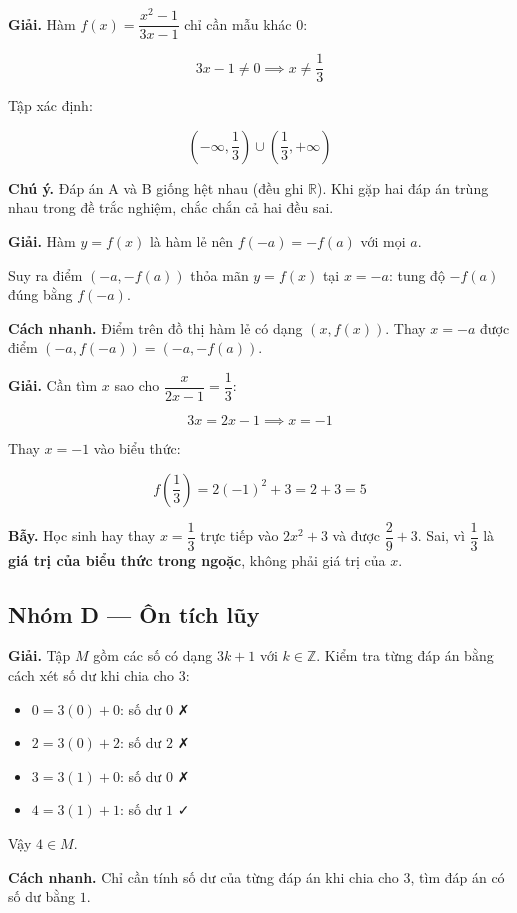 \documentclass[11pt, a4paper]{article}
\begin{document}
\begin{dapan}[21 — Đáp án D]
\textbf{Giải.} Hàm $f(x) = \dfrac{x^2-1}{3x-1}$ chỉ cần mẫu khác $0$:

$$3x - 1 \neq 0 \implies x \neq \frac{1}{3}$$

Tập xác định:

$$\left(-\infty, \frac{1}{3}\right) \cup \left(\frac{1}{3}, +\infty\right)$$

\textbf{Chú ý.} Đáp án A và B giống hệt nhau (đều ghi $\mathbb{R}$). Khi gặp hai đáp án trùng nhau trong đề trắc nghiệm, chắc chắn cả hai đều sai.
\end{dapan}

\begin{dapan}[22 — Đáp án B]
\textbf{Giải.} Hàm $y = f(x)$ là hàm lẻ nên $f(-a) = -f(a)$ với mọi $a$.

Suy ra điểm $(-a, -f(a))$ thỏa mãn $y = f(x)$ tại $x = -a$: tung độ $-f(a)$ đúng bằng $f(-a)$.

\textbf{Cách nhanh.} Điểm trên đồ thị hàm lẻ có dạng $(x, f(x))$. Thay $x = -a$ được điểm $(-a, f(-a)) = (-a, -f(a))$.
\end{dapan}

\begin{dapan}[23 — Đáp án C]
\textbf{Giải.} Cần tìm $x$ sao cho $\dfrac{x}{2x-1} = \dfrac{1}{3}$:

$$3x = 2x - 1 \implies x = -1$$

Thay $x = -1$ vào biểu thức:

$$f\!\left(\frac{1}{3}\right) = 2(-1)^2 + 3 = 2 + 3 = 5$$

\textbf{Bẫy.} Học sinh hay thay $x = \dfrac{1}{3}$ trực tiếp vào $2x^2+3$ và được $\dfrac{2}{9}+3$. Sai, vì $\dfrac{1}{3}$ là \textbf{giá trị của biểu thức trong ngoặc}, không phải giá trị của $x$.
\end{dapan}

\subsection*{Nhóm D — Ôn tích lũy}

\begin{dapan}[24 — Đáp án D]
\textbf{Giải.} Tập $M$ gồm các số có dạng $3k+1$ với $k \in \mathbb{Z}$. Kiểm tra từng đáp án bằng cách xét số dư khi chia cho $3$:
\begin{itemize}[leftmargin=1.4em, itemsep=2pt]
\item $0 = 3(0) + 0$: số dư $0$ ✗
\item $2 = 3(0) + 2$: số dư $2$ ✗
\item $3 = 3(1) + 0$: số dư $0$ ✗
\item $4 = 3(1) + 1$: số dư $1$ ✓
\end{itemize}


Vậy $4 \in M$.

\textbf{Cách nhanh.} Chỉ cần tính số dư của từng đáp án khi chia cho $3$, tìm đáp án có số dư bằng $1$.
\end{dapan}
\end{document}
